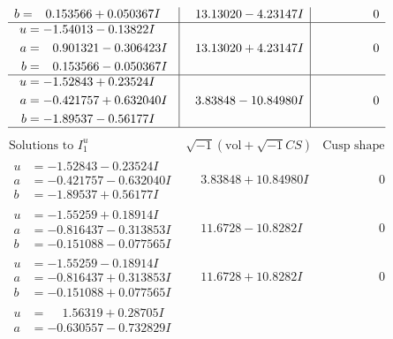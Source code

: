 \documentclass[1p]{elsarticle_modified}
\theoremstyle{definition}
\newcommand{\I}{\sqrt{-1}}
\begin{document}
$$\begin{array}{c|c|c}
\begin{aligned}
b &= \phantom{-}0.153566 + 0.050367 I\end{aligned}
 & \phantom{-}13.13020 - 4.23147 I & \phantom{-0.000000 } 0 \\ \hline\begin{aligned}
u &= -1.54013 - 0.13822 I \\
a &= \phantom{-}0.901321 - 0.306423 I \\
b &= \phantom{-}0.153566 - 0.050367 I\end{aligned}
 & \phantom{-}13.13020 + 4.23147 I & \phantom{-0.000000 } 0 \\ \hline\begin{aligned}
u &= -1.52843 + 0.23524 I \\
a &= -0.421757 + 0.632040 I \\
b &= -1.89537 - 0.56177 I\end{aligned}
 & \phantom{-}3.83848 - 10.84980 I & \phantom{-0.000000 } 0\\
 \hline 
 \end{array}$$\newpage$$\begin{array}{c|c|c}  
\text{Solutions to }I^u_{1}& \I (\text{vol} + \sqrt{-1}CS) & \text{Cusp shape}\\
 \hline 
\begin{aligned}
u &= -1.52843 - 0.23524 I \\
a &= -0.421757 - 0.632040 I \\
b &= -1.89537 + 0.56177 I\end{aligned}
 & \phantom{-}3.83848 + 10.84980 I & \phantom{-0.000000 } 0 \\ \hline\begin{aligned}
u &= -1.55259 + 0.18914 I \\
a &= -0.816437 - 0.313853 I \\
b &= -0.151088 - 0.077565 I\end{aligned}
 & \phantom{-}11.6728 - 10.8282 I & \phantom{-0.000000 } 0 \\ \hline\begin{aligned}
u &= -1.55259 - 0.18914 I \\
a &= -0.816437 + 0.313853 I \\
b &= -0.151088 + 0.077565 I\end{aligned}
 & \phantom{-}11.6728 + 10.8282 I & \phantom{-0.000000 } 0 \\ \hline\begin{aligned}
u &= \phantom{-}1.56319 + 0.28705 I \\
a &= -0.630557 - 0.732829 I \\

\end{aligned}
\end{array}$$
\end{document}
